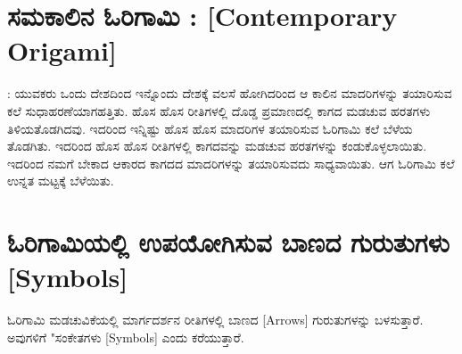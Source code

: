 \section*{ಸಮಕಾಲಿನ ಓರಿಗಾಮಿ : [Contemporary Origami]}: 
ಯುವಕರು ಒಂದು ದೇಶದಿಂದ ಇನ್ನೊಂದು ದೇಶಕ್ಕೆ ವಲಸೆ ಹೋಗಿದರಿಂದ ಆ ಕಾಲಿನ ಮಾದರಿಗಳನ್ನು ತಯಾರಿಸುವ ಕಲೆ ಸುಧಾಹರಣೆಯಾಗಹತ್ತಿತು. ಹೊಸ ಹೊಸ ರೀತಿಗಳಲ್ಲಿ ದೊಡ್ಡ ಪ್ರಮಾಣದಲ್ಲಿ ಕಾಗದ ಮಡಚುವ ಹರತಗಳು ತಿಳಿಯತೊಡಗಿದವು. ಇದರಿಂದ ಇನ್ನಿಷ್ಟು ಹೊಸ ಹೊಸ  ಮಾದರಿಗಳ ತಯಾರಿಸುವ ಓರಿಗಾಮಿ ಕಲೆ ಬೆಳೆಯ ತೊಡಗಿತು. ಇದರಿಂದ ಹೊಸ ಹೊಸ ರೀತಿಗಳಲ್ಲಿ ಕಾಗದವನ್ನು ಮಡಚುವ ಹರತಗಳನ್ನು ಕಂಡುಕೊಳ್ಳಲಾಯಿತು. ಇದರಿಂದ ನಮಗೆ ಬೇಕಾದ ಆಕಾರದ ಕಾಗದದ ಮಾದರಿಗಳನ್ನು ತಯಾರಿಸುವದು ಸಾಧ್ಯವಾಯಿತು. ಆಗ ಓರಿಗಾಮಿ ಕಲೆ ಉನ್ನತ ಮಟ್ಟಕ್ಕೆ ಬೆಳೆಯಿತು. 

\section*{ಓರಿಗಾಮಿಯಲ್ಲಿ ಉಪಯೋಗಿಸುವ ಬಾಣದ ಗುರುತುಗಳು [Symbols]}
ಓರಿಗಾಮಿ ಮಡಚುವಿಕೆಯಲ್ಲಿ ಮಾರ್ಗದರ್ಶನ ರೀತಿಗಳಲ್ಲಿ ಬಾಣದ [Arrows] ಗುರುತುಗಳನ್ನು ಬಳಸುತ್ತಾರೆ. ಅವುಗಳಿಗೆ "ಸಂಕೇತಗಳು [Symbols] ಎಂದು ಕರೆಯುತ್ತಾರೆ. 

\medskip


